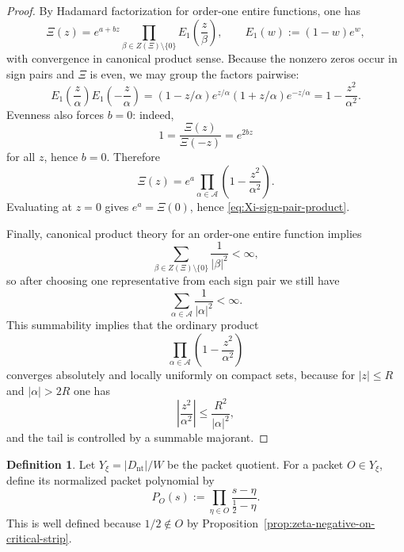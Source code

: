\documentclass[11pt,a4paper]{article}
\theoremstyle{definition}
\newtheorem{definition}[theorem]{Definition}
\theoremstyle{remark}
\begin{document}
\begin{proof}
By Hadamard factorization for order-one entire functions, one has
\[
\Xi(z)=e^{a+bz}\prod_{\beta\in Z(\Xi)\setminus\{0\}} E_1\!\left(\frac{z}{\beta}\right),
\qquad
E_1(w):=(1-w)e^w,
\]
with convergence in canonical product sense.  Because the nonzero zeros occur in sign pairs and $\Xi$ is even, we may group the factors pairwise:
\[
E_1\!\left(\frac{z}{\alpha}\right)E_1\!\left(-\frac{z}{\alpha}\right)
=(1-z/\alpha)e^{z/\alpha}(1+z/\alpha)e^{-z/\alpha}
=1-\frac{z^2}{\alpha^2}.
\]
Evenness also forces $b=0$: indeed,
\[
1=\frac{\Xi(z)}{\Xi(-z)}=e^{2bz}
\]
for all $z$, hence $b=0$.  Therefore
\[
\Xi(z)=e^a\prod_{\alpha\in\mathcal A}\left(1-\frac{z^2}{\alpha^2}\right).
\]
Evaluating at $z=0$ gives $e^a=\Xi(0)$, hence \eqref{eq:Xi-sign-pair-product}.

Finally, canonical product theory for an order-one entire function implies
\[
\sum_{\beta\in Z(\Xi)\setminus\{0\}} \frac{1}{|\beta|^2}<\infty,
\]
so after choosing one representative from each sign pair we still have
\[
\sum_{\alpha\in\mathcal A}\frac{1}{|\alpha|^2}<\infty.
\]
This summability implies that the ordinary product
\[
\prod_{\alpha\in\mathcal A}\left(1-\frac{z^2}{\alpha^2}\right)
\]
converges absolutely and locally uniformly on compact sets, because for $|z|\le R$ and $|\alpha|>2R$ one has
\[
\left|\frac{z^2}{\alpha^2}\right|\le \frac{R^2}{|\alpha|^2},
\]
and the tail is controlled by a summable majorant.
\end{proof}

\begin{definition}\label{def:packet-polynomial}
Let $Y_\xi=|D_{\mathrm{nt}}|/W$ be the packet quotient.  For a packet $O\in Y_\xi$, define its normalized packet polynomial by
\begin{equation}\label{eq:packet-polynomial-def}
P_O(s):=\prod_{\eta\in O}\frac{s-\eta}{\frac12-\eta}.
\end{equation}
This is well defined because $1/2\notin O$ by Proposition~\ref{prop:zeta-negative-on-critical-strip}.
\end{definition}
\end{document}
